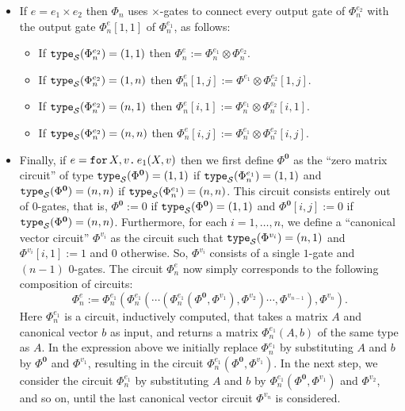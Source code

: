 \begin{itemize}
\begin{itemize}
\end{itemize}
\item If $e=e_1\times e_2$ then $\Phi_n$ uses $\times$-gates to connect every output gate of $\Phi_n^{e_2}$ with the output gate $\Phi^e_n[1,1]$ of $\Phi_n^{e_1}$, as follows:
\begin{itemize}
	\item If $\texttt{type}_{\mathcal{S}}(\Phi^{e_2}_n)=(1, 1)$  then  $\Phi^e_n:=\Phi^{e_1}_n \otimes \Phi^{e_2}_n$.
  \item If $\texttt{type}_{\mathcal{S}}(\Phi^{e_2}_n)=(1, n)$  then  $\Phi^e_n[1,j]:=\Phi^{e_1} \otimes \Phi^{e_2}_n[1,j]$.
  \item If $\texttt{type}_{\mathcal{S}}(\Phi^{e_2}_n)=(n, 1)$  then  $\Phi^e_n[i,1]:=\Phi^{e_1}_n \otimes \Phi^{e_2}_n[i,1]$.
  \item If $\texttt{type}_{\mathcal{S}}(\Phi^{e_2}_n)=(n, n)$ then $\Phi^e_n[i,j]:=\Phi^{e_1}_n \otimes \Phi^{e_2}_n[i,j]$.
\end{itemize}

\item Finally, if $e=\texttt{for}\, X,v \texttt{.}\, e_1(X, v)$ then  we first  define $\Phi^{\mathbf{0}}$ 
as the ``zero matrix circuit'' of type  $\texttt{type}_{\mathcal{S}}(\Phi^{\mathbf{0}})=(1,1)$ if $\texttt{type}_{\mathcal{S}}(\Phi^{e_1}_n)=(1,1)$ and 
$\texttt{type}_{\mathcal{S}}(\Phi^{\mathbf{0}})=(n,n)$ if $\texttt{type}_{\mathcal{S}}(\Phi^{e_1}_n)=(n,n)$.  This circuit consists entirely out of $0$-gates,
that is, $\Phi^{\mathbf{0}}:=0$ if $\texttt{type}_{\mathcal{S}}(\Phi^{\mathbf{0}})=(1,1)$ and
$\Phi^{\mathbf{0}}[i,j]:=0$ if $\texttt{type}_{\mathcal{S}}(\Phi^{\mathbf{0}})=(n,n)$.
Furthermore, for each $i=1,\ldots, n$, we define a ``canonical vector circuit'' $\Phi^{v_i}$ as the circuit such that $\texttt{type}_{\mathcal{S}}(\Phi^{v_i})=(n,1)$ and $\Phi^{v_i}[i,1]:=1$ and $0$ otherwise. So, $\Phi^{v_i}$ consists of a single $1$-gate and $(n-1)$ $0$-gates.
The circuit $\Phi_n^e$ now simply corresponds to the following composition of circuits:
$$\Phi^{e}_n:=\Phi^{e_1}_n\left( \Phi^{e_1}_n \left( \cdots \left( \Phi^{e_1}_n\left( \Phi^{\mathbf{0}}, \Phi^{v_1}\right), \Phi^{v_2}\right)\cdots, \Phi^{v_{n-1}} \right), \Phi^{v_n} \right).$$
Here $\Phi_n^{e_1}$ is a circuit, inductively computed, that takes a matrix $A$ and canonical vector $b$ as input, and returns a matrix $\Phi_n^{e_1}(A,b)$ of the same type as $A$. In the expression above we initially replace $\Phi_n^{e_1}$ by substituting $A$ and $b$ by $\Phi^{\mathbf{0}}$ and $\Phi^{v_1}$, resulting in the circuit 
$\Phi_n^{e_1}(\Phi^{\mathbf{0}},\Phi^{v_1})$. In the next step, we consider the circuit $\Phi_n^{e_1}$ by substituting $A$ and $b$ by $\Phi_n^{e_1}(\Phi^{\mathbf{0}},\Phi^{v_1})$ and 
$\Phi^{v_2}$, and so on, until the last canonical vector circuit $\Phi^{v_n}$ is considered.
\end{itemize}

